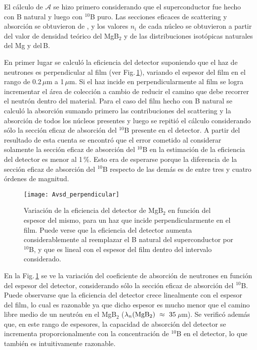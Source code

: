 El cálculo de $\mathcal{A}$ se hizo primero considerando que el superconductor fue hecho con B natural y luego con
$^{10}$B puro. Las secciones eficaces de scattering y absorción se obtuvieron de \cite{secceff}, y los valores $n_i$
de cada núcleo se obtuvieron a partir del valor de densidad teórico del MgB$_2$\cite{Lui2003} y de las distribuciones isotópicas naturales del Mg y del\,B. 

En primer lugar se calculó la eficiencia del detector suponiendo que el haz de neutrones es perpendicular al film (ver Fig.\,\ref{fig:Avsd_perpendicular}), variando el espesor del film en el rango de 0.2\,$\mu$m a 1\,$\mu$m. Si el haz incide en perpendicularmente al film se logra incrementar el área de colección a cambio de reducir el camino que debe recorrer el neutrón dentro del material. Para el caso del film hecho con B natural se calculó la absorción sumando primero las contribuciones del scattering y la absorción de todos los núcleos presentes y luego se repitió el cálculo considerando sólo la sección eficaz de absorción del $^{10}$B presente en el detector. A partir del resultado de esta cuenta se encontró que el error cometido al considerar solamente la sección eficaz de absorción del $^{10}$B en la estimación de la eficiencia del detector es menor al 1\,\%. Esto era de esperarse porque la diferencia de la sección eficaz de absorción del $^{10}$B respecto de las demás es de entre tres y cuatro órdenes de magnitud.

\begin{figure}[th!]
\vspace{-1cm}
  \begin{center}
    \texttt{[image: Avsd\_perpendicular]}
  \end{center}
  \vspace{-1cm}
  \caption[Variación de la eficiencia del detector de MgB$_2$ en función del espesor del mismo, para un haz que incide perpendicularmente en el film.]{Variación de la eficiencia del detector de MgB$_2$ en función del espesor del mismo, para un haz que incide perpendicularmente en el film. Puede verse que la eficiencia del detector aumenta considerablemente al reemplazar el B natural del superconductor por $^{10}$B, y que es lineal con el espesor del film dentro del intervalo considerado.}
\label{fig:Avsd_perpendicular}
\end{figure}

En la Fig.\,\ref{fig:Avsd_perpendicular} se ve la variación del coeficiente de absorción de neutrones en función del espesor del detector, considerando sólo la sección eficaz de absorción del $^{10}$B. Puede observarse que la eficiencia del detector crece linealmente con el espesor del film, lo cual es razonable ya que dicho espesor es mucho menor que el camino libre medio de un neutrón en el MgB$_2$ ($\lambda_n(\rm MgB_2) \ \approx \ 35$\,$\mu$m). Se verificó además que, en este rango de espesores, la capacidad de absorción del detector se incrementa proporcionalmente con la concentración de $^{10}$B en el detector, lo que también es intuitivamente razonable.


